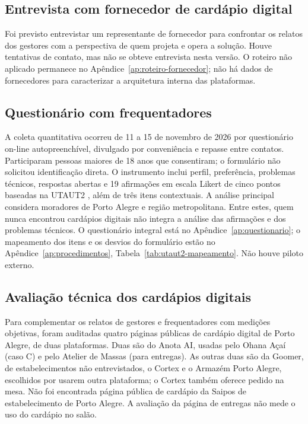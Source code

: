 \subsection{Entrevista com fornecedor de cardápio digital}
\label{sec:entrevista-fornecedor}

Foi previsto entrevistar um representante de fornecedor para confrontar os relatos dos gestores com a perspectiva de quem projeta e opera a solução. Houve tentativas de contato, mas não se obteve entrevista nesta versão. O roteiro não aplicado permanece no Apêndice~\ref{ap:roteiro-fornecedor}; não há dados de fornecedores para caracterizar a arquitetura interna das plataformas.

\subsection{Questionário com frequentadores}
\label{sec:questionario}

A coleta quantitativa ocorreu de 11 a 15 de novembro de 2026 por questionário on-line autopreenchível, divulgado por conveniência e repasse entre contatos. Participaram pessoas maiores de 18 anos que consentiram; o formulário não solicitou identificação direta. O instrumento inclui perfil, preferência, problemas técnicos, respostas abertas e 19 afirmações em escala Likert de cinco pontos baseadas na UTAUT2 \cite{venkatesh2012consumer}, além de três itens contextuais. A análise principal considera moradores de Porto Alegre e região metropolitana. Entre estes, quem nunca encontrou cardápios digitais não integra a análise das afirmações e dos problemas técnicos. O questionário integral está no Apêndice~\ref{ap:questionario}; o mapeamento dos itens e os desvios do formulário estão no Apêndice~\ref{ap:procedimentos}, Tabela~\ref{tab:utaut2-mapeamento}. Não houve piloto externo.

\subsection{Avaliação técnica dos cardápios digitais}
\label{sec:avaliacao-tecnica}

Para complementar os relatos de gestores e frequentadores com medições objetivas, foram auditadas quatro páginas públicas de cardápio digital de Porto Alegre, de duas plataformas. Duas são do Anota AI, usadas pelo Ohana Açaí (caso C) e pelo Atelier de Massas (para entregas). As outras duas são da Goomer, de estabelecimentos não entrevistados, o Cortex e o Armazém Porto Alegre, escolhidos por usarem outra plataforma; o Cortex também oferece pedido na mesa. Não foi encontrada página pública de cardápio da Saipos de estabelecimento de Porto Alegre. A avaliação da página de entregas não mede o uso do cardápio no salão.

